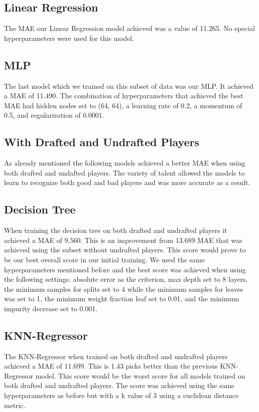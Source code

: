 \documentclass{article}
\begin{document}
\subsection{Linear Regression}

The MAE our Linear Regression model achieved was a value of 11.265. No special
hyperparameters were used for this model.

\subsection{MLP}

The last model which we trained on this subset of data was our MLP. It achieved
a MAE of 11.490. The combination of hyperparameters that achieved the
best MAE had hidden nodes set to (64, 64), a learning rate of 0.2, a momentum of
0.5, and regularization of 0.0001.

\subsection{With Drafted and Undrafted Players}

As already mentioned the following models achieved a better MAE when using both
drafted and undafted players. The variety of talent allowed the models to learn
to recognize both good and bad players and was more accurate as a result.

\subsection{Decision Tree}

When training the decision tree on both drafted and undrafted players it
achieved a MAE of 9.560. This is an improvement from 13.689 MAE that was
achieved using the subset without undrafted players. This score would prove to
be our best overall score in our initial training. We used the same
hyperparameters mentioned before and the best score was achieved when using the
following settings: absolute error as the criterion, max depth set to 8 layers,
the minimum samples for splits set to 4 while the minimum samples for leaves was
set to 1, the minimum weight fraction leaf set to 0.01, and the minimum impurity
decrease set to 0.001.

\subsection{KNN-Regressor}

The KNN-Regressor when trained on both drafted and undrafted players achieved a
MAE of 11.699. This is 1.43 picks better than the previous KNN-Regressor model.
This score would be the worst score for all models trained on both drafted and
undrafted players. The score was achieved using the same hyperparameters as
before but with a k value of 3 using a euclidean distance metric.
\end{document}
